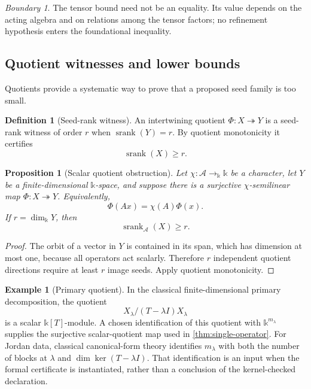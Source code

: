 \documentclass[11pt]{article}
\newtheorem{proposition}[theorem]{Proposition}
\theoremstyle{definition}
\newtheorem{definition}[theorem]{Definition}
\newtheorem{example}[theorem]{Example}
\theoremstyle{remark}
\newtheorem{boundary}[theorem]{Boundary}
\newcommand{\cA}{\mathcal A}
\newcommand{\srank}{\operatorname{srank}}
\newcommand{\bbk}{\mathbb{k}}
\begin{document}
\begin{boundary}
The tensor bound need not be an equality. Its value depends on the acting algebra and on relations among the tensor factors; no refinement hypothesis enters the foundational inequality.
\end{boundary}

\subsection{Quotient witnesses and lower bounds}

Quotients provide a systematic way to prove that a proposed seed family is too small.

\begin{definition}[Seed-rank witness]
An intertwining quotient $\Phi:X\twoheadrightarrow Y$ is a seed-rank witness of order $r$ when $\srank(Y)=r$. By quotient monotonicity it certifies
\[
\srank(X)\ge r.
\]
\end{definition}

\begin{proposition}[Scalar quotient obstruction]
\label{prop:scalar-quotient-obstruction}
Let $\chi:\cA\to_{\bbk}\bbk$ be a character, let $Y$ be a finite-dimensional $\bbk$-space, and suppose there is a surjective $\chi$-semilinear map $\Phi:X\twoheadrightarrow Y$. Equivalently,
\[
\Phi(Ax)=\chi(A)\Phi(x).
\]
If $r=\dim_{\bbk}Y$, then
\[
{\srank_{\cA}(X)\ge r.}
\]
\end{proposition}

\begin{proof}
The orbit of a vector in $Y$ is contained in its span, which has dimension at most one, because all operators act scalarly. Therefore $r$ independent quotient directions require at least $r$ image seeds. Apply quotient monotonicity.
\end{proof}

\begin{example}[Primary quotient]
In the classical finite-dimensional primary decomposition, the quotient
\[
X_{\lambda}/(T-\lambda I)X_{\lambda}
\]
is a scalar $\bbk[T]$-module. A chosen identification of this quotient with
$\bbk^{m_{\lambda}}$ supplies the surjective scalar-quotient map used in
\cref{thm:single-operator}. For Jordan data, classical canonical-form theory
identifies $m_{\lambda}$ with both the number of blocks at $\lambda$ and
$\dim\ker(T-\lambda I)$. That identification is an input when the formal
certificate is instantiated, rather than a conclusion of the kernel-checked
declaration.
\end{example}
\end{document}
